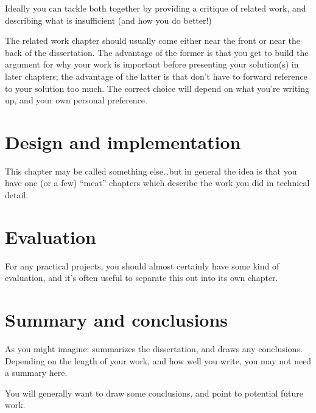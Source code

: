 \documentclass[12pt,a4paper,twoside]{report}
\begin{document}
Ideally you can tackle both together by providing a critique of
related work, and describing what is insufficient (and how you do
better!)

The related work chapter should usually come either near the front or
near the back of the dissertation. The advantage of the former is that
you get to build the argument for why your work is important before
presenting your solution(s) in later chapters; the advantage of the
latter is that don't have to forward reference to your solution too
much. The correct choice will depend on what you're writing up, and
your own personal preference.

\chapter{Design and implementation}

This chapter may be called something else\ldots but in general the
idea is that you have one (or a few) ``meat'' chapters which describe
the work you did in technical detail.


\chapter{Evaluation}

For any practical projects, you should almost certainly have some kind
of evaluation, and it's often useful to separate this out into its own
chapter.


\chapter{Summary and conclusions}

As you might imagine: summarizes the dissertation, and draws any
conclusions. Depending on the length of your work, and how well you
write, you may not need a summary here.

You will generally want to draw some conclusions, and point to
potential future work.

\label{lastcontentpage} %
\end{document}
